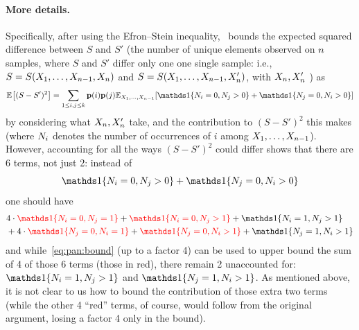 \paragraph{More details.} Specifically, after using the Efron--Stein inequality,~\citet{Paninski08} bounds the expected squared difference between $S$ and $S'$ (the number of unique elements observed on $n$ samples, where $S$ and $S'$ differ only one one single sample: i.e., $S=S(X_1,\dots,X_{n-1}, X_n)$ and $S=S(X_1,\dots,X_{n-1}, X'_n)$, with $X_n,X'_n$ \iid) as
\[
  \bEE{(S-S')^2} = \sum_{1\leq i,j\leq \ab} \p(i)\p(j) \bE{X_1,\dots,X_{\ns-1}}{ \indic{\occur_i=0, \occur_j>0} + \indic{\occur_j=0, \occur_i>0} }
\]
by considering what $X_n,X'_n$ take, and the contribution to $(S-S')^2$ this makes (where $N_i$ denotes the number of occurrences of $i$ among $X_1,\dots,X_{n-1}$).
However, accounting for all the ways $(S-S')^2$ could differ shows that there are 6 terms, not just 2: instead of 
\begin{equation}
  \label{eq:pan:bound}
\indic{\occur_i=0, \occur_j>0} + \indic{\occur_j=0, \occur_i>0} 
\end{equation}
one should have
\begin{align*}
& 4\cdot \textcolor{red}{\indic{\occur_i=0, \occur_j=1}} + \textcolor{red}{\indic{\occur_i=0, \occur_j>1}} + \indic{\occur_i=1, \occur_j>1} \\
&+ 4\cdot \textcolor{red}{\indic{\occur_j=0, \occur_i=1}} + \textcolor{red}{\indic{\occur_j=0, \occur_i>1}} + \indic{\occur_j=1, \occur_i>1} 
\end{align*}
and while~\eqref{eq:pan:bound} (up to a factor 4) can be used to upper bound the sum of 4 of those 6 terms (those in red), there remain 2 unaccounted for:
$
\indic{\occur_i=1, \occur_j>1}
$
and 
$
\indic{\occur_j=1, \occur_i>1}
$. As mentioned above, it is not clear to us how to bound the contribution of those extra two terms (while the other 4 ``red'' terms, of course, would follow from the original argument, losing a factor 4 only in the bound).
\fi
